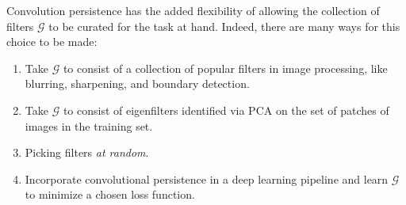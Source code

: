 \documentclass[conference]{IEEEtran}
\theoremstyle{definition}
\numberwithin{figure}{section}
\begin{document}
%



Convolution persistence has the added flexibility of allowing the collection of filters $\mathcal{G}$ to be curated for the task at hand. Indeed, there are many ways for this choice to be made:
\begin{enumerate}
	\item Take $\mathcal{G}$ to consist of a collection of popular filters in image processing, like blurring, sharpening, and boundary detection.
	\item Take $\mathcal{G}$ to consist of eigenfilters identified via PCA on the set of patches of images in the training set.
	\item Picking filters \emph{at random}.
	\item Incorporate convolutional persistence in a deep learning pipeline and learn $\mathcal{G}$ to minimize a chosen loss function.
\end{enumerate}
\end{document}
